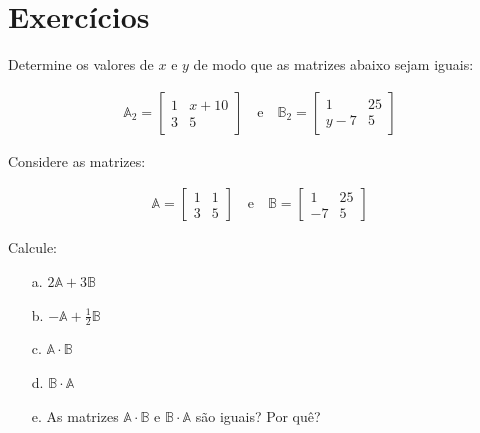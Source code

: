 \section{Exercícios}

\begin{exercise}
	Determine os valores de $x$ e $y$ de modo que as matrizes abaixo sejam iguais:
	
	\begin{ceqn}
		\begin{align*}
		\mathbb{A}_{2}=\begin{bmatrix}1 & x+10 \\ 3 & 5 \end{bmatrix} \quad \mathrm{e} \quad \mathbb{B}_{2}=\begin{bmatrix}1 & 25 \\ y-7 & 5 \end{bmatrix}
		\end{align*}
	\end{ceqn}
\end{exercise}

\begin{exercise}
	Considere as matrizes:
	\begin{ceqn}
		\begin{align*}
				\mathbb{A}=\begin{bmatrix}1 & 1 \\ 3 & 5 \end{bmatrix} \quad \mathrm{e} \quad \mathbb{B}=\begin{bmatrix}1 & 25 \\ -7 & 5 \end{bmatrix}
		\end{align*}
	\end{ceqn}
	Calcule:
	\begin{itemize}
		\item[a.]{$2 \mathbb{A}+3\mathbb{B}$}
		\item[b.]{$-\mathbb{A}+\frac{1}{2}\mathbb{B}$}
		\item[c.]{$\mathbb{A} \cdot \mathbb{B}$}
		\item[d.]{$\mathbb{B} \cdot \mathbb{A}$}
		\item[e.]{As matrizes $\mathbb{A} \cdot \mathbb{B}$ e $\mathbb{B} \cdot \mathbb{A}$ são iguais? Por quê?}
	\end{itemize}
\end{exercise}

